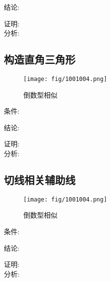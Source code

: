 \documentclass[cn,blue,10pt]{elegantbook}
\begin{document}
结论: \( \) 

证明:\\

分析: 

\subsection{构造直角三角形}%
\label{sub:构造直角三角形}

\begin{figure}[h]
    \centering
    \texttt{[image: fig/1001004.png]}
    \caption{倒数型相似}%
    \label{fig:倒数型相似}
\end{figure}
条件: \(\) 

结论: \( \) 

证明:\\

分析: 
\subsection{切线相关辅助线}%
\label{sub:切线相关辅助线}

\begin{figure}[h]
    \centering
    \texttt{[image: fig/1001004.png]}
    \caption{倒数型相似}%
    \label{fig:倒数型相似}
\end{figure}
条件: \(\) 

结论: \( \) 

证明:\\

分析: 
\end{document}
